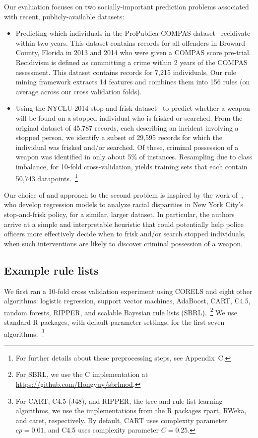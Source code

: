 Our evaluation focuses on two socially-important prediction problems associated
with recent, publicly-available datasets:
\begin{itemize}
\item Predicting which individuals in the ProPublica COMPAS
dataset~\citep{LarsonMaKiAn16} recidivate within two years.
This dataset contains records for all offenders in Broward County, Florida
in 2013 and 2014 who were given a COMPAS score pre-trial.
Recidivism is defined as committing a crime within 2 years of the COMPAS
assessment.
This dataset contains records for 7,215 individuals.
%
Our rule mining framework extracts 14 features and combines them into
156 rules (on average across our cross validation folds).
%
\item Using the NYCLU 2014 stop-and-frisk dataset~\citep{nyclu:2014} to predict
whether a weapon will be found on a stopped individual who is frisked or searched.
%
From the original dataset of 45,787 records, each describing an incident involving
a stopped person, we identify a subset of 29,595 records for which the individual
was frisked and/or searched.
%
Of these, criminal possession of a weapon was identified in only about 5\% of instances.
%
Resampling due to class imbalance, for 10-fold cross-validation, yields training sets
that each contain 50,743 datapoints.~\footnote{For further details about these
preprocessing steps, see Appendix~C.}
\end{itemize}
%
Our choice of and approach to the second problem is inspired by the work
of~\citet{Goel16}, who develop regression models to analyze racial disparities
in New York City's stop-and-frisk policy, for a similar, larger dataset.
%
In particular, the authors arrive at a simple and interpretable heuristic that
could potentially help police officers more effectively decide when to
frisk and/or search stopped individuals, \ie when such
interventions are likely to discover criminal possession of a weapon.

\subsection{Example rule lists}

We first ran a 10-fold cross validation experiment using CORELS
and eight other algorithms:
logistic regression, support vector machines, AdaBoost, CART, C4.5,
random forests, RIPPER, and scalable Bayesian rule lists (SBRL).~\footnote{For
SBRL, we use the C implementation at \url{https://github.com/Hongyuy/sbrlmod}.}
%
We use standard R packages, with default parameter settings,
for the first seven algorithms.~\footnote{For CART, C4.5 (J48), and RIPPER,
\ie the tree and rule list learning algorithms, we use the implementations
from the R packages rpart, RWeka, and caret, respectively.
%
By default, CART uses complexity parameter ${cp = 0.01}$,
and C4.5 uses complexity parameter ${C = 0.25}$.
}

